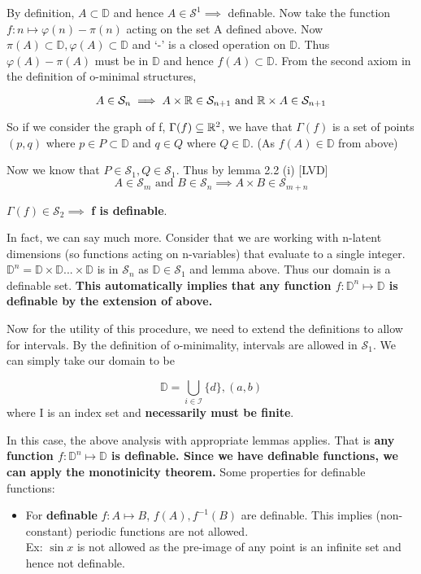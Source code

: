 By definition, $A\subset\mathbb{D}$ and hence $A\in\mathcal{S}^1 \implies $ definable.
Now take the function $f: n\mapsto\varphi(n) - \pi(n)$ acting on the set A defined above. Now $\pi(A)\subset\mathbb{D}, \varphi(A)\subset\mathbb{D}$ and `-' is a closed operation on $\mathbb{D}$. Thus $\varphi(A) - \pi(A)$ must be in $\mathbb{D}$ and hence $f(A)\subset\mathbb{D}$.
From the second axiom in the definition of o-minimal structures,

\begin{equation*}
    A \in \mathcal{S}_n\implies A \times\mathbb{R}\in\mathcal{S}_{n+1} \text{ and } \mathbb{R} \times A\in\mathcal{S}_{n+1}
\end{equation*}

So if we consider the graph of f, $\Gamma(f)\subseteq\mathbb{R}^2$, we have that $\Gamma(f)$ is a set of points $(p,q)$ where $p\in P\subset\mathbb{D}$ and $q\in Q$ where $Q\in\mathbb{D}$. (As $f(A)\in\mathbb{D}$ from above)

Now we know that $P\in\mathcal{S}_1, Q\in\mathcal{S}_1$. Thus by lemma 2.2 (i) [LVD]
\begin{equation*}
    A\in\mathcal{S}_m \text{ and } B\in\mathcal{S}_n \implies A\times B\in\mathcal{S}_{m+n}
\end{equation*}

$\Gamma(f)\in\mathcal{S}_2\implies$ \textbf{f is definable}.

In fact, we can say much more. Consider that we are working with n-latent dimensions (so functions acting on n-variables) that evaluate to a single integer. $\mathbb{D}^n = \mathbb{D}\times\mathbb{D}...\times\mathbb{D}$ is in $\mathcal{S}_n$ as $\mathbb{D}\in\mathcal{S}_1$ and lemma above. Thus our domain is a definable set. 
\textbf{This automatically implies that any function $f:\mathbb{D}^n\mapsto\mathbb{D}$ is definable by the extension of above.}

Now for the utility of this procedure, we need to extend the definitions to allow for intervals. By the definition of o-minimality, intervals are allowed in $\mathcal{S}_1$. We can simply take our domain to be

\begin{equation*}
    \mathbb{D} = \bigcup_{i\in\mathcal{I}} \{d\}, (a,b)
\end{equation*}
where I is an index set and \textbf{necessarily must be finite}.

In this case, the above analysis with appropriate lemmas applies. That is \textbf{any function $f:\mathbb{D}^n\mapsto\mathbb{D}$ is definable. Since we have definable functions, we can apply the monotinicity theorem.}
Some properties for definable functions:
\begin{itemize}
    \item For \textbf{ definable } $f:A\mapsto B$, $f(A), f^{-1}(B)$ are definable. This implies (non-constant) periodic functions are not allowed.
    \\
    Ex: $\sin{x}$ is not allowed as the pre-image of any point is an infinite set and hence not definable.
\end{itemize}

